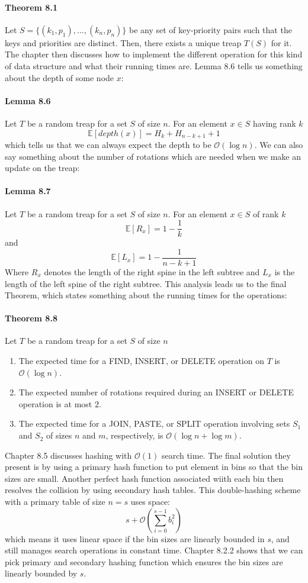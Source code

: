 \documentclass[a4paper, fleqn]{article}
\begin{document}
\paragraph{Theorem 8.1} Let $S=\{(k_1, p_1),...,(k_n, p_n)\}$ be any set of key-priority pairs such that the keys and priorities are distinct. Then, there exists a unique treap $T(S)$ for it.
The chapter then discusses how to implement the different operation for this kind of data structure and what their running times are. Lemma 8.6 tells us something about the depth of some node $x$:
\paragraph{Lemma 8.6} Let $T$ be a random treap for a set $S$ of size $n$. For an element $x\in S$ having rank $k$
$$\mathbb{E}[depth(x)] = H_k + H_{n-k+1}+1$$
which tells us that we can always expect the depth to be $\mathcal{O}(\log n)$. We can also say something about the number of rotations which are needed when we make an update on the treap:
\paragraph{Lemma 8.7} Let $T$ be a random treap for a set $S$ of size $n$. For an element $x\in S$ of rank $k$
$$\mathbb{E}[R_x]=1-\frac{1}{k}$$
and 
$$\mathbb{E}[L_x]=1-\frac{1}{n-k+1}$$
Where $R_x$ denotes the length of the right spine in the left subtree and $L_x$ is the length of the left spine of the right subtree. This analysis leads us to the final Theorem, which states something about the running times for the operations:
\paragraph{Theorem 8.8} Let $T$ be a random treap for a set $S$ of size $n$
\begin{enumerate}
\item The expected time for a \textsc{FIND}, \textsc{INSERT}, or \textsc{DELETE} operation on $T$ is $\mathcal{O}(\log n)$.
\item The expected number of rotations required during an \textsc{INSERT} or \textsc{DELETE} operation is at most $2$.
\item The expected time for a \textsc{JOIN}, \textsc{PASTE}, or \textsc{SPLIT} operation involving sets $S_1$ and $S_2$ of sizes $n$ and $m$, respectively, is $\mathcal{O}(\log n + \log m)$.
\end{enumerate} 
Chapter 8.5 discusses hashing with $\mathcal{O}(1)$ search time. The final solution they present is by using a primary hash function to put element in bins so that the bin sizes are small. Another perfect hash function associated wiith each bin then resolves the collision by using secondary hash tables. This double-hashing scheme with a primary table of size $n=s$ uses space:
$$s+\mathcal{O}\left( \sum_{i=0}^{s-1}b_i^2\right)$$
which means it uses linear space if the bin sizes are linearly bounded in $s$, and still manages search operations in constant time. Chapter 8.2.2 shows that we can pick primary and secondary hashing function which ensures the bin sizes are linearly bounded by $s$.
\end{document}
